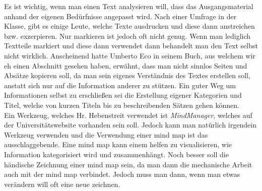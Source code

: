 \documentclass{article}
\begin{document}
	Es ist wichtig, wenn man einen Text analysieren will, dass das Ausgangsmaterial anhand der eigenen Bedürfnisse angepasst wird. Nach einer Umfrage in der Klasse, gibt es einige Leute, welche Texte ausdrucken und diese dann anstreichen bzw. exzerpieren. Nur markieren ist jedoch oft nicht genug. Wenn man lediglich Textteile markiert und diese dann verwendet dann behandelt man den Text selbst nicht wirklich. Anscheinend hatte Umberto Eco in seinem Buch, aus welchem wir eh einen Abschnitt gesehen haben, erwähnt, dass man nicht sinnlos Seiten und Absätze kopieren soll, da man sein eigenes Verständnis des Textes erstellen soll, anstatt sich nur auf die Information anderer zu stützen. Ein guter Weg um Informationen selbst zu erschließen sei die Erstellung eigener Kategorien und Titel, welche von kurzen Titeln bis zu beschreibenden Sätzen gehen können. \\
	Ein Werkzeug, welches Hr. Hebenstreit verwendet ist \textit{MindManager}, welches auf der Universitätswebsite vorhanden sein soll. Jedoch kann man natürlich irgendein Werkzeug verwenden und die Verwendung einer mind map ist das ausschlaggebende. Eine mind map kann einem helfen zu visualisieren, wie Information kategorisiert wird und zusammenhängt. Noch besser soll die händische Zeichnung einer mind map sein, da man dann die mechanische Arbeit auch mit der mind map verbindet. Jedoch muss man dann, wenn man etwas verändern will oft eine neue zeichnen. \\
	


	

	
\end{document}
